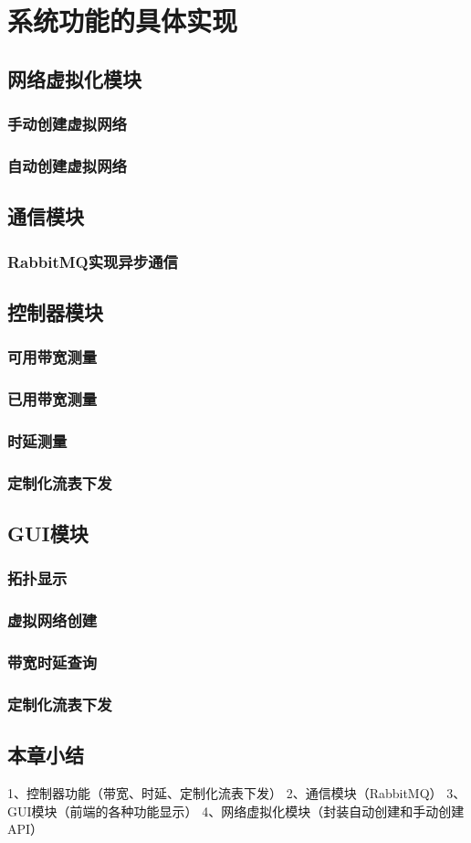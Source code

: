 \chapter{系统功能的具体实现}
\section{网络虚拟化模块}
\subsection{手动创建虚拟网络}
\subsection{自动创建虚拟网络}
\section{通信模块}
\subsection{RabbitMQ实现异步通信}
\section{控制器模块}
\subsection{可用带宽测量}
\subsection{已用带宽测量}
\subsection{时延测量}
\subsection{定制化流表下发}
\section{GUI模块}
\subsection{拓扑显示}
\subsection{虚拟网络创建}
\subsection{带宽时延查询}
\subsection{定制化流表下发}
\section{本章小结}



1、控制器功能（带宽、时延、定制化流表下发）
2、通信模块（RabbitMQ）
3、GUI模块（前端的各种功能显示）
4、网络虚拟化模块（封装自动创建和手动创建API）